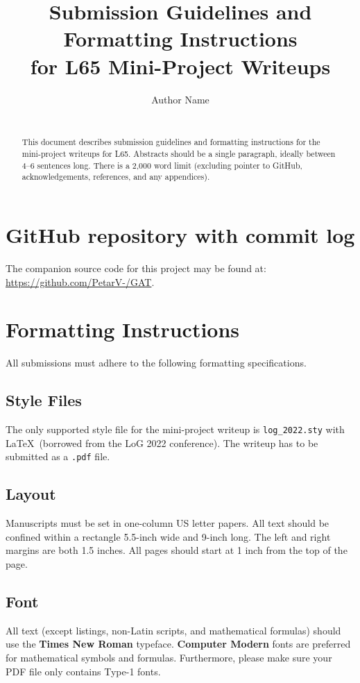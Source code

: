 \documentclass{article}
\title[Submission Guidelines and Formatting Instructions for L65 Mini-Project Writeups]{Submission Guidelines and Formatting Instructions\\ for L65 Mini-Project Writeups}
\author[Author Name]{%
Author Name\\
\institute{University of Cambridge}\\
\email{crsid@cam.ac.uk}
}
\begin{document}
\maketitle

\begin{abstract}
This document describes submission guidelines and formatting instructions for the mini-project writeups for L65.
Abstracts should be a single paragraph, ideally between 4--6 sentences long.
There is a 2,000 word limit (excluding pointer to GitHub, acknowledgements, references, and any appendices).
\end{abstract}

\section*{GitHub repository with commit log}

The companion source code for this project may be found at: \url{https://github.com/PetarV-/GAT}.

\section{Formatting Instructions}

All submissions must adhere to the following formatting specifications.

\subsection{Style Files}

The only supported style file for the mini-project writeup is \verb+log_2022.sty+ with \LaTeX\ (borrowed from the LoG 2022 conference).
The writeup has to be submitted as a \texttt{.pdf} file.

\subsection{Layout}
Manuscripts must be set in one-column US letter papers.
All text should be confined within a rectangle 5.5-inch wide and 9-inch long.
The left and right margins are both 1.5 inches.
All pages should start at 1 inch from the top of the page.

\subsection{Font}
All text (except listings, non-Latin scripts, and mathematical formulas) should use the \textbf{Times New Roman} typeface.
\textbf{Computer Modern} fonts are preferred for mathematical symbols and formulas.
Furthermore, please make sure your PDF file only contains Type-1 fonts.
\end{document}
